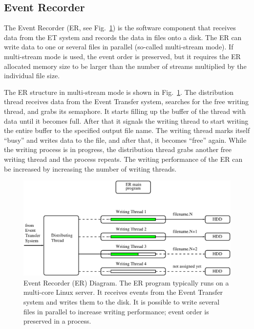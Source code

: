 \subsection{Event Recorder}

The Event Recorder (ER, see Fig.~\ref{fig:er_diagram}) is the software component that receives data from the ET system and records the data in files onto a disk. The ER can write data to one or several files in parallel (so-called multi-stream mode). If multi-stream mode is used, the event order is preserved, but it requires the ER allocated memory size to be larger than the number of streams multiplied by the individual file size.

The ER structure in multi-stream mode is shown in Fig.~\ref{fig:er_diagram}. The distribution thread receives data from the Event Transfer system, searches for the free writing thread, and grabs its semaphore. It starts filling up the buffer of the thread with data until it becomes full. After that it signals the writing thread to start writing the entire buffer to the specified output file name. The writing thread marks itself ``busy'' and writes data to the file, and after that, it becomes ``free'' again. While the writing process is in progress, the distribution thread grabs another free writing thread and the process repeats. The writing performance of the ER can be increased by increasing the number of writing threads.

\begin{figure}[hbt]
	\centering
	\includegraphics[width=1.0\columnwidth,keepaspectratio]{img/er_diagram.pdf}
	\caption{Event Recorder (ER) Diagram. The ER program typically runs on a multi-core Linux server. It receives events from the Event Transfer system and writes them to the disk. It is possible to write several files in parallel to increase writing performance; event order is preserved in a process.}
	\label{fig:er_diagram}
\end{figure}


